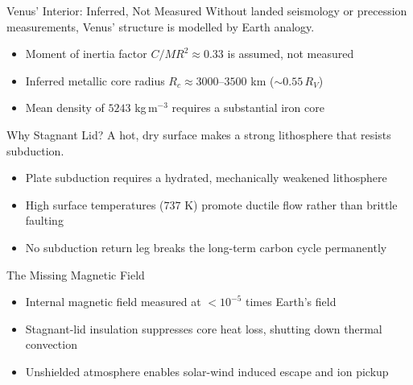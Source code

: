 \documentclass[aspectratio=169, 11pt]{beamer}
\begin{document}
\begin{frame}{Venus' Interior: Inferred, Not Measured}
  Without landed seismology or precession measurements, Venus' structure is modelled by Earth analogy.
  \vskip6pt
  \begin{itemize}
    \item Moment of inertia factor $C/MR^2 \approx 0.33$ is assumed, not measured
    \item Inferred metallic core radius $R_c \approx 3000$--$3500$ km ($\sim 0.55\, R_V$)
    \item Mean density of $5243$ kg\,m$^{-3}$ requires a substantial iron core
  \end{itemize}
\end{frame}

\begin{frame}{Why Stagnant Lid?}
  A hot, dry surface makes a strong lithosphere that resists subduction.
  \vskip6pt
  \begin{itemize}
    \item Plate subduction requires a hydrated, mechanically weakened lithosphere
    \item High surface temperatures ($737$ K) promote ductile flow rather than brittle faulting
    \item No subduction return leg breaks the long-term carbon cycle permanently
  \end{itemize}
  \vskip4pt
\end{frame}

\begin{frame}
\end{frame}

\begin{frame}{The Missing Magnetic Field}
  \begin{itemize}
    \item Internal magnetic field measured at $< 10^{-5}$ times Earth's field
    \item Stagnant-lid insulation suppresses core heat loss, shutting down thermal convection
    \item Unshielded atmosphere enables solar-wind induced escape and ion pickup
  \end{itemize}
\end{frame}
\end{document}

